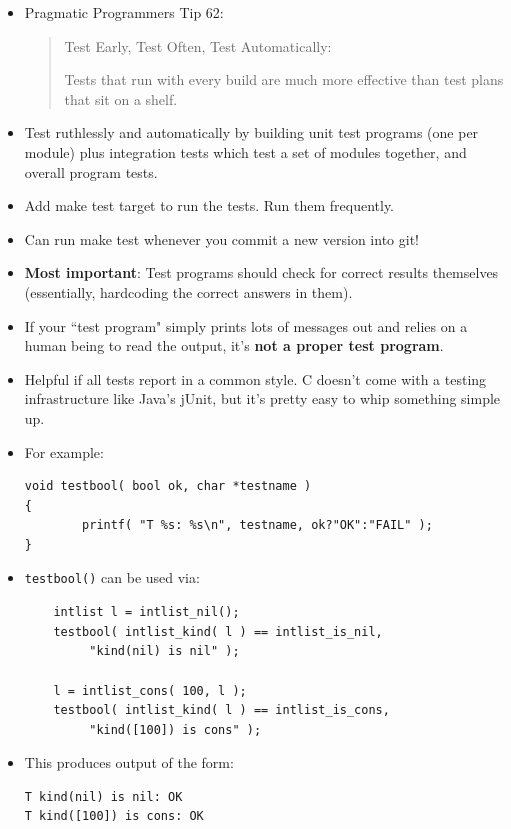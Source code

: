 \documentclass[handout]{beamer}
\newcommand{\pitem}{\pause \item}
\begin{document}
\begin{frame}[fragile]
    \begin{itemize}
      \item
	Pragmatic Programmers Tip 62:
\begin{quote}
Test Early, Test Often, Test Automatically:

Tests that run with every build are much more
effective than test plans that sit on a shelf.
\end{quote}
    \pause
    \item
      Test \alert{ruthlessly} and \alert{automatically}
      by building \alert{unit test} programs (one per module) plus
      \alert{integration} tests which test a set of modules together,
      and \alert{overall} program tests.
    \item
      Add \alert{make test} target to run the tests.
      Run them frequently.
    \item
      Can run \alert{make test}
      whenever you commit a new version into git!
    \pitem
      {\bf Most important}:
      Test programs should check for correct results themselves
      (essentially, hardcoding the correct answers in them).
    \pitem
      If your ``test program" simply prints lots of messages out
      and relies on a human being to read the output, it's
      {\bf not a proper test program}.

    \pitem
      Helpful if all tests report in a common style.
      C doesn't come with a testing infrastructure like Java's jUnit,
      but it's pretty easy to whip something simple up.
    \end{itemize}
\end{frame}

\begin{frame}[fragile]
    \begin{itemize}
      \item
      For example:

{\small
\begin{verbatim}
void testbool( bool ok, char *testname )
{
        printf( "T %s: %s\n", testname, ok?"OK":"FAIL" );
}
\end{verbatim}
}
	\item
	\verb+testbool()+ can be used via:

{\small
\begin{verbatim}
	intlist l = intlist_nil();
	testbool( intlist_kind( l ) == intlist_is_nil,
	     "kind(nil) is nil" );

	l = intlist_cons( 100, l );
	testbool( intlist_kind( l ) == intlist_is_cons,
	     "kind([100]) is cons" );
\end{verbatim}
}

      \item
      This produces output of the form:
{\small
\begin{verbatim}
T kind(nil) is nil: OK
T kind([100]) is cons: OK
\end{verbatim}
}

    \end{itemize}
\end{frame}
\end{document}
